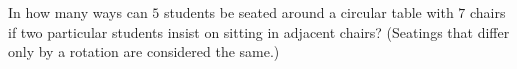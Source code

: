 In how many ways can $5$ students be seated around a circular table with $7$ chairs if two particular students insist on sitting in adjacent chairs? (Seatings that differ only by a rotation are considered the same.)
